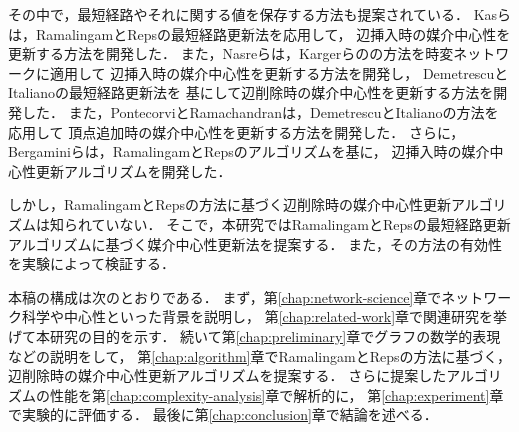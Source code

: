 その中で，最短経路やそれに関する値を保存する方法も提案されている．
Kasらは，RamalingamとRepsの最短経路更新法\cite{Ramalingam1996}を応用して，
辺挿入時の媒介中心性を更新する方法を開発した\cite{Kas2013}．
また，Nasreらは，Kargerらの\cite{Karger1993}の方法を時変ネットワークに適用して
辺挿入時の媒介中心性を更新する方法を開発し\cite{Nasre2014a}，
DemetrescuとItalianoの最短経路更新法\cite{Demetrescu2003}を
基にして辺削除時の媒介中心性を更新する方法を開発した\cite{Nasre2014b}．
また，PontecorviとRamachandranは，DemetrescuとItalianoの方法を応用して
頂点追加時の媒介中心性を更新する方法を開発した\cite{Pontecorvi2015}．
さらに，Bergaminiらは，RamalingamとRepsのアルゴリズムを基に，
辺挿入時の媒介中心性更新アルゴリズムを開発した\cite{Bergamini2017}．

しかし，RamalingamとRepsの方法に基づく辺削除時の媒介中心性更新アルゴリズムは知られていない．
そこで，本研究ではRamalingamとRepsの最短経路更新アルゴリズムに基づく媒介中心性更新法を提案する．
また，その方法の有効性を実験によって検証する．

本稿の構成は次のとおりである．
まず，第\ref{chap:network-science}章でネットワーク科学や中心性といった背景を説明し，
第\ref{chap:related-work}章で関連研究を挙げて本研究の目的を示す．
続いて第\ref{chap:preliminary}章でグラフの数学的表現などの説明をして，
第\ref{chap:algorithm}章でRamalingamとRepsの方法に基づく，
辺削除時の媒介中心性更新アルゴリズムを提案する．
さらに提案したアルゴリズムの性能を第\ref{chap:complexity-analysis}章で解析的に，
第\ref{chap:experiment}章で実験的に評価する．
最後に第\ref{chap:conclusion}章で結論を述べる．
